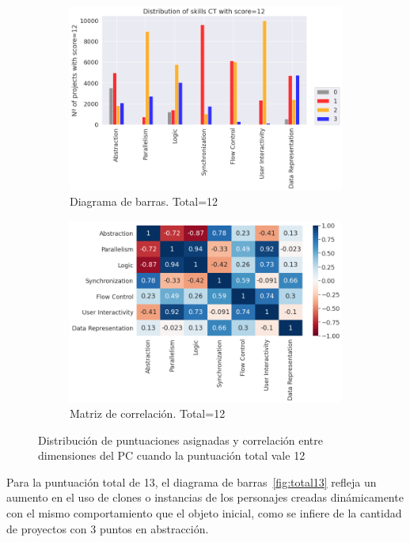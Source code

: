 \documentclass[a4paper, 12pt]{book}
\begin{document}
\begin{figure}[H]
    \centering
    \begin{subfigure}[h]{.49\textwidth} 
        \includegraphics[width=\textwidth]{img/distribucion_12_Scratch}
        \caption{Diagrama de barras. Total=12}
        \label{fig:total12}
    \end{subfigure}       
    \begin{subfigure}[h]{.49\textwidth} 
        \includegraphics[width=\textwidth]{img/corr_12_Scratch}
        \caption{Matriz de correlación. Total=12}
        \label{fig:corr12}
    \end{subfigure}
     \caption{Distribución de puntuaciones asignadas y correlación entre dimensiones del PC cuando la puntuación total vale 12}
\end{figure}

Para la puntuación total de 13, el diagrama de barras~\ref{fig:total13} refleja un aumento en el uso de clones o instancias de los personajes creadas dinámicamente con el mismo comportamiento que el objeto inicial, como se infiere de la cantidad de proyectos con 3 puntos en abstracción.
\end{document}

